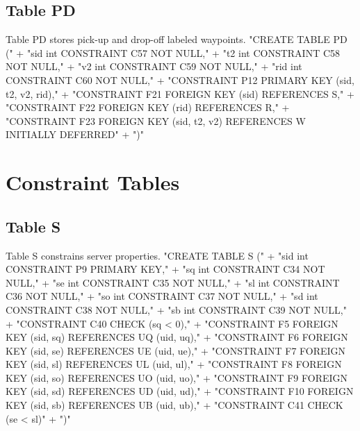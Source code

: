 \subsection{Table PD}
Table PD stores pick-up and drop-off labeled waypoints.
\nwenddocs{}\endmoddef{}
"CREATE TABLE PD ("
  + "sid int  CONSTRAINT C57 NOT NULL,"
  + "t2  int  CONSTRAINT C58 NOT NULL,"
  + "v2  int  CONSTRAINT C59 NOT NULL,"
  + "rid int  CONSTRAINT C60 NOT NULL,"
  + "CONSTRAINT P12 PRIMARY KEY (sid, t2, v2, rid),"
  + "CONSTRAINT F21 FOREIGN KEY (sid) REFERENCES S,"
  + "CONSTRAINT F22 FOREIGN KEY (rid) REFERENCES R,"
  + "CONSTRAINT F23 FOREIGN KEY (sid, t2, v2) REFERENCES W INITIALLY DEFERRED"
  + ")"
\nwendcode{}\nwdocspar

\section{Constraint Tables}

\subsection{Table S}
Table S constrains server properties.
\nwenddocs{}\endmoddef{}
"CREATE TABLE S ("
  + "sid int  CONSTRAINT P9 PRIMARY KEY,"
  + "sq  int  CONSTRAINT C34 NOT NULL,"
  + "se  int  CONSTRAINT C35 NOT NULL,"
  + "sl  int  CONSTRAINT C36 NOT NULL,"
  + "so  int  CONSTRAINT C37 NOT NULL,"
  + "sd  int  CONSTRAINT C38 NOT NULL,"
  + "sb  int  CONSTRAINT C39 NOT NULL,"
  + "CONSTRAINT C40 CHECK (sq < 0),"
  + "CONSTRAINT F5 FOREIGN KEY (sid, sq) REFERENCES UQ (uid, uq),"
  + "CONSTRAINT F6 FOREIGN KEY (sid, se) REFERENCES UE (uid, ue),"
  + "CONSTRAINT F7 FOREIGN KEY (sid, sl) REFERENCES UL (uid, ul),"
  + "CONSTRAINT F8 FOREIGN KEY (sid, so) REFERENCES UO (uid, uo),"
  + "CONSTRAINT F9 FOREIGN KEY (sid, sd) REFERENCES UD (uid, ud),"
  + "CONSTRAINT F10 FOREIGN KEY (sid, sb) REFERENCES UB (uid, ub),"
  + "CONSTRAINT C41 CHECK (se < sl)"
  + ")"
\nwendcode{}\nwdocspar


